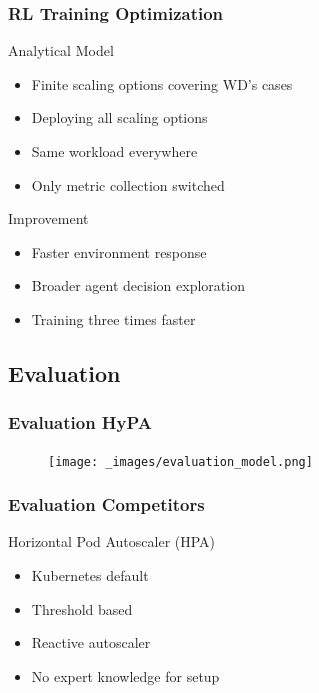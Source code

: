 \documentclass[11pt,t,usepdftitle=false,aspectratio=169]{beamer}
\begin{document}
\begin{frame}
	\frametitle{RL Training Optimization}
	
	\begin{alertblock}{Analytical Model}
		\begin{itemize}
			\item Finite scaling options covering WD's cases
			\item Deploying all scaling options
			\item Same workload everywhere
			\item Only metric collection switched
		\end{itemize}
	\end{alertblock}
	
	\begin{block}{Improvement}
		\begin{itemize}
			\item Faster environment response
			\item Broader agent decision exploration
			\item Training three times faster
		\end{itemize}
	\end{block}
\end{frame}

\subsection{Evaluation}

\begin{frame}
	\frametitle{Evaluation HyPA}
	
	\begin{figure}
		\centering
		\vspace*{-0.4cm}
		\texttt{[image: \_images/evaluation\_model.png]}
	\end{figure}
\end{frame}


\begin{frame}
	\frametitle{Evaluation Competitors}
	
	\begin{block}{Horizontal Pod Autoscaler (HPA)}
		\begin{itemize}
			\item Kubernetes default
			\item Threshold based
			\item Reactive autoscaler
			\item No expert knowledge for setup
		\end{itemize}
	\end{block}
\end{frame}
\end{document}
